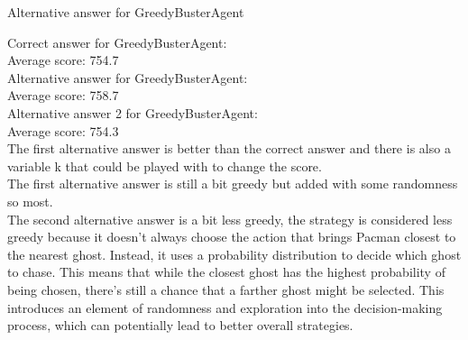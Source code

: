 \documentclass[12pt]{article}
\newenvironment{Question}[2][Question]{\begin{trivlist}
\item[\hskip \labelsep {\bfseries #1}\hskip \labelsep {\bfseries #2.}]}{\end{trivlist}}
\begin{document}
\begin{Question}{3}
 Alternative answer for GreedyBusterAgent
\end{Question}
Correct answer for GreedyBusterAgent: \\
Average score: 754.7\\
Alternative answer for GreedyBusterAgent: \\
Average score: 758.7\\
Alternative answer 2 for GreedyBusterAgent: \\
Average score: 754.3\\
The first alternative answer is better than the correct answer and there is also a variable k that could be played with to change the score.\\
The first alternative answer is still a bit greedy but added with some randomness so most.\\
The second alternative answer is a bit less greedy, the strategy is considered less greedy because it doesn't always choose the action that brings Pacman closest to the nearest ghost.
Instead, it uses a probability distribution to decide which ghost to chase.
This means that while the closest ghost has the highest probability of being chosen, there's still a chance that a farther ghost might be selected.
This introduces an element of randomness and exploration into the decision-making process, which can potentially lead to better overall strategies.
\end{document}

